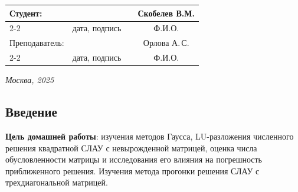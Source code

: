 \documentclass[12pt, a4paper]{article}
\begin{document}
\begin{titlepage}
		\fontsize{14}{21}\selectfont
		\vspace{5cm}
		
		
		\noindent\begin{tabularx}{\textwidth}{ X >{\centering}p{4cm} p{1cm} c }
			Студент: & & & Скобелев В.М.\\ \cline{2-2} \cline{4-4}
			& \fontsize{10}{15}\selectfont дата, подпись & & \fontsize{10}{15}\selectfont Ф.И.О. \\
			Преподаватель: & & & Орлова А.\,С.\\ \cline{2-2} \cline{4-4}
			& \fontsize{10}{15}\selectfont дата, подпись & & \fontsize{10}{15}\selectfont Ф.И.О.		\end{tabularx}
		
		\vspace{\fill}
		
		\begin{center}
			\it{Москва}, 2025
		\end{center}
		
		\thispagestyle{empty}
	\end{titlepage}

\renewcommand{\contentsname}{Содержание}
	\setcounter{page}{2}
	\tableofcontents
	
	\newpage
	\begin{center}
		\section*{Введение} 
	\end{center}
	
	\vspace{5mm}
	\raggedright
	\justifying
	\textbf{Цель домашней  работы}: изучения методов Гаусса, LU-разложения численного решения квадратной СЛАУ с невырожденной матрицей, оценка числа обусловленности матрицы и исследования его влияния на погрешность приближенного решения. Изучения метода прогонки решения СЛАУ с трехдиагональной матрицей.
\end{document}
